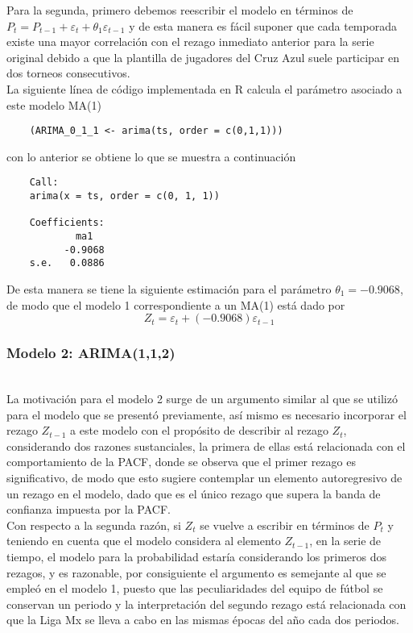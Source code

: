 \documentclass{article}
\theoremstyle{remark}
\begin{document}
Para la segunda, primero debemos reescribir el modelo en términos de $P_t = P_{t-1} + \varepsilon_t + \theta_1\varepsilon_{t-1} $ y de esta manera es fácil suponer que cada temporada existe una mayor correlación con el rezago inmediato anterior para la serie original debido a que la plantilla de jugadores del Cruz Azul suele participar en dos torneos consecutivos.\\

La siguiente línea de código implementada en R calcula el parámetro asociado a este modelo MA(1)

\begin{verbatim}
    (ARIMA_0_1_1 <- arima(ts, order = c(0,1,1))) 
\end{verbatim}
con lo anterior se obtiene lo que se muestra a continuación
\begin{verbatim}
    Call:
    arima(x = ts, order = c(0, 1, 1))

    Coefficients:
            ma1
          -0.9068
    s.e.   0.0886
\end{verbatim}
De esta manera se tiene la siguiente estimación para el parámetro $\theta_1=-0.9068$, de modo que el modelo 1 correspondiente a un MA(1) está dado por
\begin{equation*}
    Z_t = \varepsilon_t + (-0.9068)\varepsilon_{t-1}
\end{equation*}


\subsubsection{Modelo 2: ARIMA(1,1,2)}\\

La motivación para el modelo 2 surge de un argumento similar al que se utilizó para el modelo que se presentó previamente, así mismo es necesario incorporar el rezago $Z_{t-1}$ a este modelo con el propósito de describir al rezago $Z_{t}$, considerando dos razones sustanciales, la primera de ellas está relacionada con el comportamiento de la PACF, donde se observa que el primer rezago es significativo, de modo que esto sugiere contemplar un elemento autoregresivo de un rezago en el modelo, dado que es el único rezago que supera la banda de confianza impuesta por la PACF.\\

Con respecto a la segunda razón, si $Z_{t}$ se vuelve a escribir en términos de $P_t$ y teniendo en cuenta que el modelo considera al elemento $Z_{t-1}$, en la serie de tiempo, el modelo para la probabilidad estaría considerando los primeros dos rezagos, y es razonable, por consiguiente el argumento es semejante al que se empleó en el modelo 1, puesto que las peculiaridades del equipo de fútbol se conservan un periodo y la interpretación del segundo rezago está relacionada con que la Liga Mx se lleva a cabo en las mismas épocas del año cada dos periodos.\\
\end{document}
